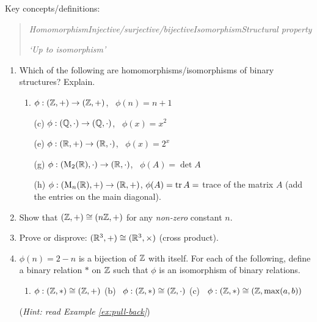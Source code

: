 \begin{exercises}{}
	Key concepts/definitions:
	\begin{quote}
		\emph{Homomorphism\qquad Injective/surjective/bijective\qquad Isomorphism\qquad Structural property}\par
		\emph{`Up to isomorphism'}
	\end{quote}
	
	\begin{enumerate}
		\item Which of the following are homomorphisms/isomorphisms of binary structures? Explain.
	  \begin{enumerate}
	    \item {} $\phi:(\mathbb{Z},+)\to (\mathbb{Z},+)$, \ $\phi(n)=n+1$
	    
	    \item[(c)]  $\phi:(\mathbb{Q},\cdot)\to (\mathbb{Q},\cdot)$, \ $\phi(x)=x^2$
	    
	    \item[(e)]  $\phi:(\mathbb{R},+)\to (\mathbb{R},\cdot)$, \ $\phi(x)=2^x$
	    
	    \item[(g)] $\phi:(\mathrm{M}_2(\mathbb{R}),\cdot)\to (\mathbb{R},\cdot)$, \ $\phi(A)=\det A$
	    
	    \item[(h)] $\phi:(\mathrm{M}_n(\mathbb{R}),+)\to (\mathbb{R},+)$, $\phi(A)=\operatorname{tr} A=$ trace of the matrix $A$ (add the entries on the main diagonal).
	  \end{enumerate}
	  
	  
	  \item Show that $(\mathbb{Z},+)\cong (n\mathbb{Z},+)$ for any \emph{non-zero} constant $n$.
	  
	  
	  \item Prove or disprove: $(\mathbb{R}^3,+)\cong(\mathbb{R}^3,\times)$ (cross product). 
	  
	  
	  \item $\phi(n)=2-n$ is a bijection of $\mathbb{Z}$ with itself. For each of the following, define a binary relation $*$ on $\mathbb{Z}$ such that $\phi$ is an isomorphism of binary relations.
	  \begin{enumerate}
	    \item $\phi:(\mathbb{Z},*)\cong (\mathbb{Z},+)$\quad\qquad
	    (b) \ $\phi:(\mathbb{Z},*)\cong (\mathbb{Z},\cdot)$\quad\qquad 
	    (c) \ $\phi:(\mathbb{Z},*)\cong (\mathbb{Z},\max(a,b))$
	  \end{enumerate}
	  (\emph{Hint: read Example \ref{ex:pull-back}})
	  

\end{enumerate}
\end{exercises}
